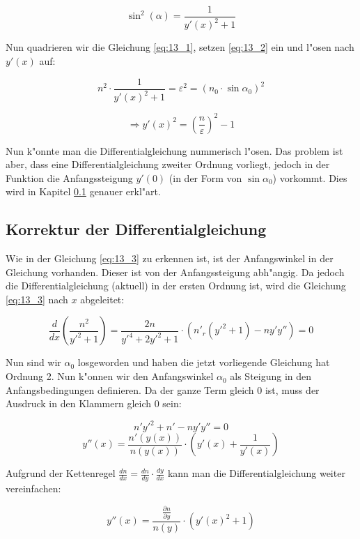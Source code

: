 \begin{equation} \label{eq:13_2}
\sin^2 (\alpha) = \frac{1}{y'(x)^2 + 1}
\end{equation}

Nun quadrieren wir die Gleichung \ref{eq:13_1}, setzen \ref{eq:13_2} ein und l"osen nach $y'(x)$ auf:

\begin{equation} \label{eq:13_3}
n^2 \cdot \frac{1}{y'(x)^2 + 1} = \varepsilon^2 = (n_0 \cdot \sin \alpha_0)^2
\end{equation}

\begin{equation} \label{eq:13_4}
\Rightarrow y'(x)^2 = \left( \frac{n}{\varepsilon} \right)^2 - 1
\end{equation}

Nun k"onnte man die Differentialgleichung nummerisch l"osen. 
Das problem ist aber, dass eine Differentialgleichung zweiter Ordnung vorliegt, jedoch in der Funktion die Anfangssteigung $y'(0)$ (in der Form von $\sin \alpha_0$) vorkommt. 
Dies wird in Kapitel \ref{ch:korrektur} genauer erkl"art.

\subsection{Korrektur der Differentialgleichung} \label{ch:korrektur}

Wie in der Gleichung \ref{eq:13_3} zu erkennen ist, ist der Anfangswinkel in der Gleichung vorhanden. 
Dieser ist von der Anfangssteigung abh"angig. 
Da jedoch die Differentialgleichung (aktuell) in der ersten Ordnung ist, wird die Gleichung \ref{eq:13_3} nach $x$ abgeleitet:

$$\frac{d}{dx} \left( \frac{n^2}{y'^2 + 1} \right) = \frac{2n}{y'^4 + 2y'^2 + 1} \cdot \left( n'_r(y'^2 + 1) - n y' y'' \right) = 0$$

Nun sind wir $\alpha_0$ losgeworden und haben die jetzt vorliegende Gleichung hat Ordnung 2. 
Nun k"onnen wir den Anfangswinkel $\alpha_0$ als Steigung in den Anfangsbedingungen definieren. 
Da der ganze Term gleich 0 ist, muss der Ausdruck in den Klammern gleich 0 sein:

$$n'y'^2 + n' - n y' y'' = 0$$
$$y''(x) = \frac{n'(y(x))}{n(y(x))} \cdot \left( y'(x) + \frac{1}{y'(x)} \right)$$

Aufgrund der Kettenregel $\frac{dn}{dx} = \frac{dn}{dy} \cdot \frac{dy}{dx}$ kann man die Differentialgleichung weiter vereinfachen:

\begin{equation} \label{eq:planar_DGL}
y''(x) = \frac{\frac{\partial n}{\partial y}}{n(y)} \cdot \left( y'(x)^2 + 1\right)
\end{equation}

